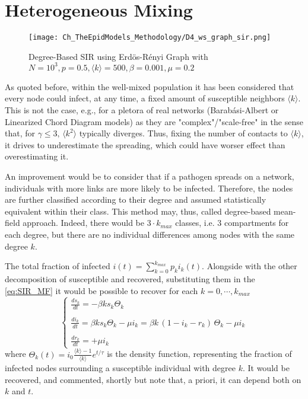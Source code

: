 \documentclass[a4paper,10pt,twoside]{book} %
\theoremstyle{definition}
\begin{document}
\newpage
\section{Heterogeneous Mixing}
\label{sec:degree-basedMF}
\begin{figure}[ht]
	\texttt{[image: Ch\_TheEpidModels\_Methodology/D4\_ws\_graph\_sir.png]}
	\caption{Degree-Based SIR using Erdös-Rényi Graph with $N = 10^{3}, p = 0.5, \langle k \rangle = 500, \beta = 0.001,  \mu = 0.2$}
	\label{fig:DB_SIR}
\end{figure}
As quoted before, within the well-mixed population it has been considered that every node could infect, at any time, a fixed amount of susceptible neighbors $\langle k \rangle$. This is not the case, e.g., for a pletora of real networks (Barabási-Albert or Linearized Chord Diagram models) as they are "complex"/"scale-free" in the sense that, for $\gamma \leq 3, \, \langle k^2 \rangle$ typically diverges. Thus, fixing the number of contacts to $\langle k \rangle$, it drives to underestimate the spreading, which could have worser effect than overestimating it. 

An improvement would be to consider that if a pathogen spreads on a network, individuals with more links are more likely to be infected. Therefore, the nodes are further classified according to their degree and assumed statistically equivalent within their class. This method may, thus, called degree-based mean-field approach. Indeed, there would be $3 \cdot k_{max}$ classes, i.e. $3$ compartments for each degree, but there are no individual differences among nodes with the same degree $k$. 

The total fraction of infected $i(t) = \sum_{k=0}^{k_{max}} p_k i_k(t)$. Alongside with the other decomposition of susceptible and recovered, substituting them in the \autoref{eq:SIR_MF} it would be possible to recover for each $k = 0,\cdots,k_{max}$
\begin{equation}
	\begin{cases}
		\frac{ds_k}{dt} = -\beta  k  s_k \Theta_k \\ \\ 
		\frac{di_k}{dt} = \beta  k  s_k \Theta_k - \mu i_k = \beta  k  \, (1-i_k-r_k) \, \Theta_k -\mu i_k \label{eqs:SIR_degree-based} \\ \\
		\frac{dr_k}{dt} = +\mu i_k
	\end{cases}	
\end{equation}
where $\Theta_k(t) = i_0 \frac{\langle k \rangle - 1}{\langle k \rangle} e^{t/\tau}$ is the density function, representing the fraction of infected nodes surrounding a susceptible individual with degree $k$. It would be recovered, and commented, shortly but note that, a priori, it can depend both on $k$ and $t$.
\end{document}
